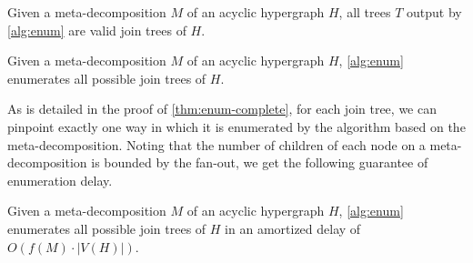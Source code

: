 \begin{theorem}[Correctness]
\label{the:correctness}
    Given a meta-decomposition $M$ of an acyclic hypergraph $H$, all trees $T$ output by \cref{alg:enum} are valid join trees of $H$.
\end{theorem}

\begin{theorem}[Completeness] \label{thm:enum-complete}
    Given a meta-decomposition $M$ of an acyclic hypergraph $H$, \cref{alg:enum} enumerates all possible join trees of $H$.
\end{theorem}

As is detailed in the proof of \cref{thm:enum-complete}, for each join tree, we can pinpoint exactly one way in which it is enumerated by the algorithm based on the meta-decomposition. Noting that the number of children of each node on a meta-decomposition is bounded by the fan-out, we get the following guarantee of enumeration delay.

\begin{theorem}
    Given a meta-decomposition $M$ of an acyclic hypergraph $H$, \cref{alg:enum} enumerates all possible join trees of $H$ in an amortized delay of $O(f(M) \cdot|V(H)|)$.
\end{theorem}

